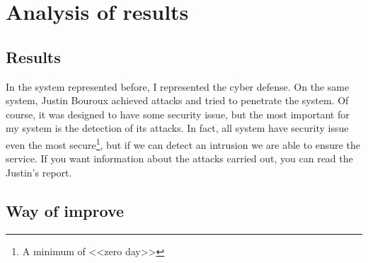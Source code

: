 
\chapter{Analysis of results}
\label{chap:analysis}


\section{Results}

In the system represented before, I represented the cyber defense. On the same system, Justin Bouroux achieved
attacks and tried to penetrate the system. Of course, it was designed to have some security issue, but the most
important for my system is the detection of its attacks. In fact, all system have security issue even the most
secure\footnote{A minimum of <<zero day>>}, but if we can detect an intrusion we are able to ensure the service. If
you want information about the attacks carried out, you can read the Justin's report.





\section{Way of improve}





